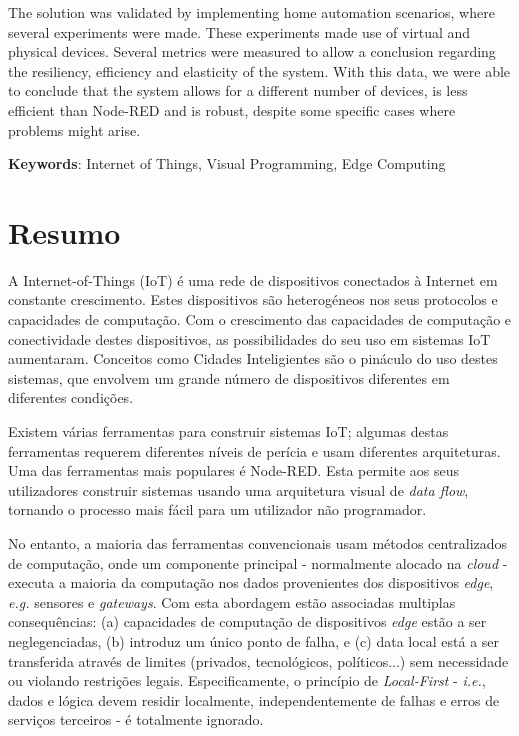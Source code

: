 The solution was validated by implementing home automation scenarios, where several experiments were made. These experiments made use of virtual and physical devices. Several metrics were measured to allow a conclusion regarding the resiliency, efficiency and elasticity of the system. With this data, we were able to conclude that the system allows for a different number of devices, is less efficient than Node-RED and is robust, despite some specific cases where problems might arise.

\vspace*{10mm}\noindent
\textbf{Keywords}: Internet of Things, Visual Programming, Edge Computing

\chapter*{Resumo}

A Internet-of-Things (IoT) é uma rede de dispositivos conectados à Internet em constante crescimento. Estes dispositivos são heterogéneos nos seus protocolos e capacidades de computação. Com o crescimento das capacidades de computação e conectividade destes dispositivos, as possibilidades do seu uso em sistemas IoT aumentaram. Conceitos como Cidades Inteligientes são o pináculo do uso destes sistemas, que envolvem um grande número de dispositivos diferentes em diferentes condições.

Existem várias ferramentas para construir sistemas IoT; algumas destas ferramentas requerem diferentes níveis de perícia e usam diferentes arquiteturas. Uma das ferramentas mais populares é Node-RED. Esta permite aos seus utilizadores construir sistemas usando uma arquitetura visual de \emph{data flow}, tornando o processo mais fácil para um utilizador não programador.
\par No entanto, a maioria das ferramentas convencionais usam métodos centralizados de computação, onde um componente principal - normalmente alocado na \emph{cloud} - executa a maioria da computação nos dados provenientes dos dispositivos \emph{edge}, \emph{e.g.} sensores e \emph{gateways}. Com esta abordagem estão associadas multiplas consequências: (a) capacidades de computação de dispositivos \emph{edge} estão a ser neglegenciadas, (b) introduz um único ponto de falha, e (c) data local está a ser transferida através de limites (privados, tecnológicos, políticos...) sem necessidade ou violando restrições legais. Especificamente, o princípio de \emph{Local-First} - \emph{i.e.}, dados e lógica devem residir localmente, independentemente de falhas e erros de serviços terceiros - é totalmente ignorado.

